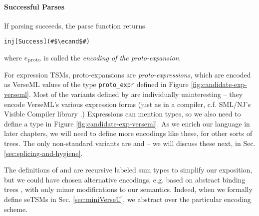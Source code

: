 

\paragraph{Successful Parses} If parsing succeeds, the parse function returns 
\begin{lstlisting}[numbers=none]
inj[Success](#$\ecand$#)
\end{lstlisting} 
where $e_\text{proto}$ is called the \emph{encoding of the proto-expansion}. 

For expression TSMs, proto-expansions are \emph{proto-expressions}, which are encoded as VerseML values of the type \lstinline{proto_expr} defined in Figure \ref{fig:candidate-exp-verseml}.
Most of the variants defined by  are individually uninteresting -- they encode VerseML's various expression forms (just as in a compiler, c.f. SML/NJ's Visible Compiler library \cite{SML/VisibleCompiler}.) 
Expressions can mention types, so we also need to define a type  in Figure \ref{fig:candidate-exp-verseml}. As we enrich our language in later chapters, we will need to define more encodings like these, for other sorts of trees. The only non-standard variants are  and  -- we will discuss these next, in Sec. \ref{sec:splicing-and-hygiene}. 

The definitions of  and  are recursive labeled sum types to simplify our exposition, but we could have chosen alternative encodings, e.g. based on abstract binding trees \cite{pfpl}, with only minor modifications to our semantics. Indeed, when we formally define seTSMs in Sec. \ref{sec:miniVerseU}, we abstract over the particular encoding scheme.





